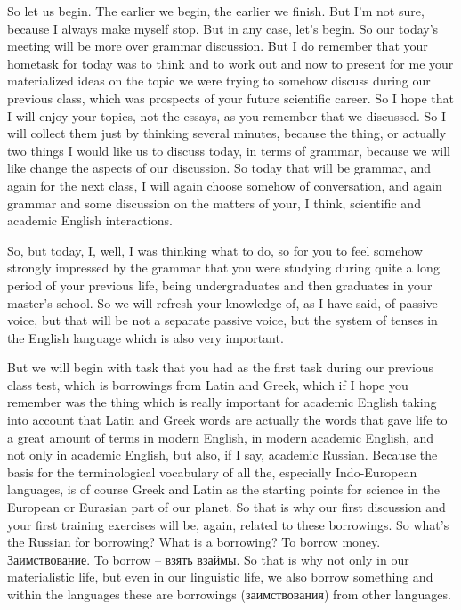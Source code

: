\documentclass[main.tex]{subfiles}
\begin{document}

So let us begin.
The earlier we begin, the earlier we finish.
But I'm not sure, because I always make myself stop.
But in any case, let's begin.
So our today's meeting will be more over grammar discussion.
But I do remember that your hometask for today was to think and to work out and now to present for me your materialized ideas on the topic we were trying to somehow discuss during our previous class, which was prospects of your future scientific career.
So I hope that I will enjoy your topics, not the essays, as you remember that we discussed.
So I will collect them just by thinking several minutes, because the thing, or actually two things I would like us to discuss today, in terms of grammar, because we will like change the aspects of our discussion.
So today that will be grammar, and again for the next class, I will again choose somehow of conversation, and again grammar and some discussion on the matters of your, I think, scientific and academic English interactions.

So, but today, I, well, I was thinking what to do, so for you to feel somehow strongly impressed by the grammar that you were studying during quite a long period of your previous life, being undergraduates and then graduates in your master's school.
So we will refresh your knowledge of, as I have said, of passive voice, but that will be not a separate passive voice, but the system of tenses in the English language which is also very important.

But we will begin with task that you had as the first task during our previous class test, which is borrowings from Latin and Greek, which if I hope you remember was the thing which is really important for academic English taking into account that Latin and Greek words are actually the words that gave life to a great amount of terms in modern English, in modern academic English, and not only in academic English, but also, if I say, academic Russian.
Because the basis for the terminological vocabulary of all the, especially Indo-European languages, is of course Greek and Latin as the starting points for science in the European or Eurasian part of our planet.
So that is why our first discussion and your first training exercises will be, again, related to these borrowings.
So what's the Russian for borrowing? What is a borrowing? To borrow money.
Заимствование.
To borrow -- взять взаймы.
So that is why not only in our materialistic life, but even in our linguistic life, we also borrow something and within the languages these are borrowings (заимствования) from other languages.
\end{document}
